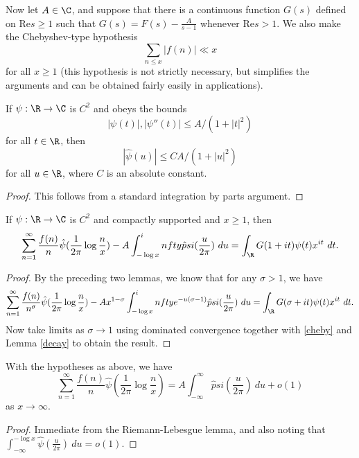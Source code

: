Now let $A \in \C$, and suppose that there is a continuous function $G(s)$ defined on $\mathrm{Re} s \geq 1$ such that $G(s) = F(s) - \frac{A}{s-1}$ whenever $\mathrm{Re} s > 1$.  We also make the Chebyshev-type hypothesis
\begin{equation}\label{cheby}
\sum_{n \leq x} |f(n)| \ll x
\end{equation}
for all $x \geq 1$ (this hypothesis is not strictly necessary, but simplifies the arguments and can be obtained fairly easily in applications).

\begin{lemma}\label{decay}  If $\psi:\R \to \C$ is $C^2$ and obeys the bounds
  $$ |\psi(t)|, |\psi''(t)| \leq A / (1 + |t|^2)$$
  for all $t \in \R$, then
$$ |\hat \psi(u)| \leq C A / (1+|u|^2)$$
for all $u \in \R$, where $C$ is an absolute constant.
\end{lemma}

\begin{proof} This follows from a standard integration by parts argument.
\end{proof}

\begin{lemma}\label{limiting}  If $\psi: \R \to \C$ is $C^2$ and compactly supported and $x \geq 1$, then
$$ \sum_{n=1}^\infty \frac{f(n)}{n} \hat \psi( \frac{1}{2\pi} \log \frac{n}{x} ) - A \int_{-\log x}^infty \hat psi(\frac{u}{2\pi})\ du =  \int_\R G(1+it) \psi(t) x^{it}\ dt.$$
\end{lemma}

\begin{proof}  By the preceding two lemmas, we know that for any $\sigma>1$, we have
  $$ \sum_{n=1}^\infty \frac{f(n)}{n^\sigma} \hat \psi( \frac{1}{2\pi} \log \frac{n}{x} ) - A x^{1-\sigma} \int_{-\log x}^infty e^{-u(\sigma-1)} \hat psi(\frac{u}{2\pi})\ du =  \int_\R G(\sigma+it) \psi(t) x^{it}\ dt.$$
  Now take limits as $\sigma \to 1$ using dominated convergence together with \eqref{cheby} and Lemma \ref{decay} to obtain the result.
\end{proof}

\begin{corollary}\label{limiting-cor}  With the hypotheses as above, we have
  $$ \sum_{n=1}^\infty \frac{f(n)}{n} \hat \psi( \frac{1}{2\pi} \log \frac{n}{x} ) = A \int_{-\infty}^\infty \hat psi(\frac{u}{2\pi})\ du + o(1)$$
  as $x \to \infty$.
\end{corollary}

\begin{proof} Immediate from the Riemann-Lebesgue lemma, and also noting that $\int_{-\infty}^{-\log x} \hat \psi(\frac{u}{2\pi})\ du = o(1)$.
\end{proof}

